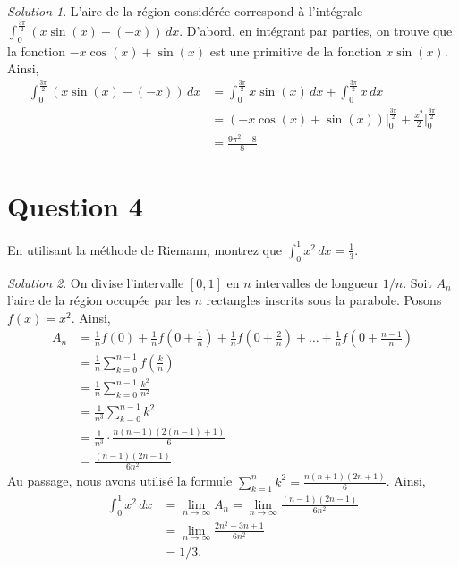 \documentclass[
  12pt,
  letterpaper,
]{book}
\theoremstyle{remark}
\newtheorem*{solution}{Solution}
\begin{document}
\begin{solution}
L'aire de la région considérée correspond à l'intégrale
\(\int_{0}^{\frac{3\pi}{2}}(x\sin(x)-(-x))\,dx\). D'abord, en intégrant
par parties, on trouve que la fonction \(-x\cos(x)+\sin(x)\) est une
primitive de la fonction \(x\sin(x)\). Ainsi, \begin{align}
\int_{0}^{\frac{3\pi}{2}}(x\sin(x)-(-x))\,dx&=\int_{0}^{\frac{3\pi}{2}}x\sin(x)\,dx+\int_{0}^{\frac{3\pi}{2}}x\,dx \\
&=\left(-x\cos(x)+\sin(x)\right)\Big|_{0}^{\frac{3\pi}{2}}+\frac{x^2}{2}\Big|_{0}^{\frac{3\pi}{2}} \\
&=\frac{9\pi^2-8}{8}
\end{align}

\end{solution}

\hypertarget{question-4-2}{%
\section{Question 4}\label{question-4-2}}

En utilisant la méthode de Riemann, montrez que
\(\int_0^1x^2\,dx=\frac{1}{3}\).

\begin{solution}

On divise l'intervalle \([0,1]\) en \(n\) intervalles de longueur
\(1/n\). Soit \(A_n\) l'aire de la région occupée par les \(n\)
rectangles inscrits sous la parabole. Posons \(f(x)=x^2\). Ainsi,
\begin{align}
A_n&=\frac{1}{n}f(0)+\frac{1}{n}f\left(0+\frac{1}{n}\right)+\frac{1}{n}f\left(0+\frac{2}{n}\right)+\ldots+\frac{1}{n}f\left(0+\frac{n-1}{n}\right) \\
&=\frac{1}{n}\sum_{k=0}^{n-1}f\left(\frac{k}{n}\right) \\
&=\frac{1}{n}\sum_{k=0}^{n-1}\frac{k^2}{n^2} \\
&=\frac{1}{n^3}\sum_{k=0}^{n-1}k^2 \\
&=\frac{1}{n^3}\cdot\frac{n(n-1)(2(n-1)+1)}{6} \\
&=\frac{(n-1)(2n-1)}{6n^2}
\end{align} Au passage, nous avons utilisé la formule
\(\sum_{k=1}^nk^2=\frac{n(n+1)(2n+1)}{6}\). Ainsi, \begin{align}
\int_{0}^1 x^2\,dx&=\lim_{n\rightarrow\infty}A_n=\lim_{n\rightarrow\infty}\frac{(n-1)(2n-1)}{6n^2} \\
&=\lim_{n\rightarrow\infty}\frac{2n^2-3n+1}{6n^2} \\
&=1/3.
\end{align}

\end{solution}
\end{document}
